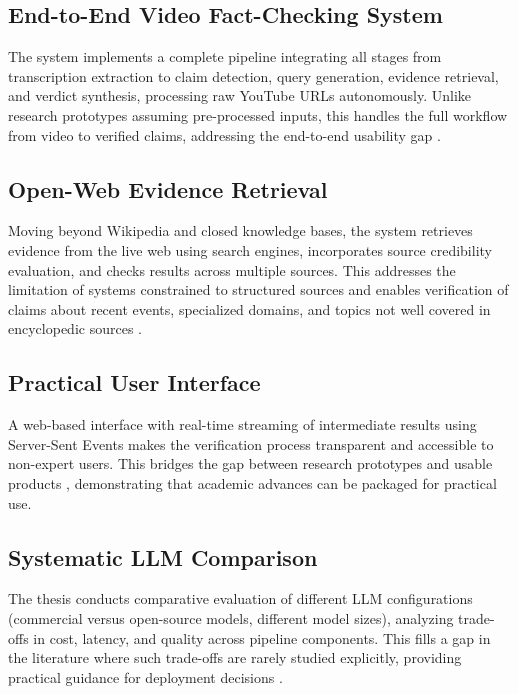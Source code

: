 \documentclass[12pt,a4paper]{article}
\begin{document}
\subsection{End-to-End Video Fact-Checking System}

The system implements a complete pipeline integrating all stages from transcription extraction to claim detection, query generation, evidence retrieval, and verdict synthesis, processing raw YouTube URLs autonomously. Unlike research prototypes assuming pre-processed inputs, this handles the full workflow from video to verified claims, addressing the end-to-end usability gap \citep{lin2025factaudit}.

\subsection{Open-Web Evidence Retrieval}

Moving beyond Wikipedia and closed knowledge bases, the system retrieves evidence from the live web using search engines, incorporates source credibility evaluation, and checks results across multiple sources. This addresses the limitation of systems constrained to structured sources and enables verification of claims about recent events, specialized domains, and topics not well covered in encyclopedic sources \citep{aly2021feverous, thorne2018fever}.

\subsection{Practical User Interface}

A web-based interface with real-time streaming of intermediate results using Server-Sent Events makes the verification process transparent and accessible to non-expert users. This bridges the gap between research prototypes and usable products \citep{lin2025factaudit}, demonstrating that academic advances can be packaged for practical use.

\subsection{Systematic LLM Comparison}

The thesis conducts comparative evaluation of different LLM configurations (commercial versus open-source models, different model sizes), analyzing trade-offs in cost, latency, and quality across pipeline components. This fills a gap in the literature where such trade-offs are rarely studied explicitly, providing practical guidance for deployment decisions \citep{raschka2025llmeval}.
\end{document}
